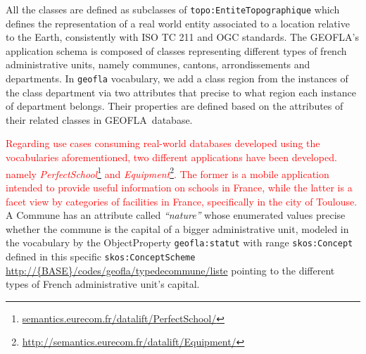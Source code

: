All the classes are defined as subclasses of  \texttt{topo:EntiteTopographique} which defines the representation of a real world entity associated to a location relative to the Earth, consistently with ISO TC 211 and OGC standards. 
The GEOFLA\circledR 's application schema is composed of classes representing different types of french administrative units, namely communes, cantons, arrondissements and departments. In \texttt{geofla} vocabulary, we add a class region  from the instances of the class department via two attributes  that precise to what region each instance of department belongs.  Their properties are defined based on the attributes of their related classes in GEOFLA\circledR ~database.

\textcolor{red}{Regarding use cases consuming  real-world databases developed using the vocabularies aforementioned, two different applications have been developed. namely \textit{PerfectSchool}\footnote{\url{semantics.eurecom.fr/datalift/PerfectSchool/}}  and \textit{Equipment}\footnote{\url{http://semantics.eurecom.fr/datalift/Equipment/}}. The former is a mobile application intended to provide useful information on schools in France, while the latter is a facet view by categories of facilities in France, specifically in the city of Toulouse. }
A Commune has an attribute called \textit{``nature''} whose enumerated values precise whether the commune is the capital of a bigger administrative unit, modeled in the vocabulary by the ObjectProperty \texttt{geofla:statut} with range \texttt{skos:Concept} defined in this specific \texttt{skos:ConceptScheme} \url{http://{BASE}/codes/geofla/typedecommune/liste} pointing to the different types of French administrative unit's capital. 





